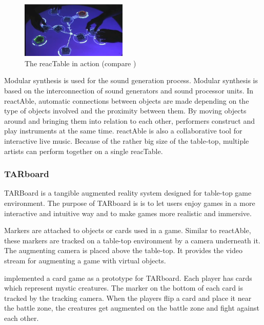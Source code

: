 \begin{figure}
\centering
\includegraphics[width=0.45\textwidth]{figures/reactable.pdf}
\caption{The reacTable in action (compare )}
\label{fig:reactable}
\end{figure}

Modular synthesis is used for the sound generation process. Modular synthesis is based on the interconnection of sound generators and sound processor units. In reactAble, automatic connections between objects are made depending on the type of objects involved and the proximity between them. By moving objects around and bringing them into relation to each other, performers construct and play instruments at the same time. reactAble is also a collaborative tool for interactive live music. Because of the rather big size of the table-top, multiple artists can perform together on a single reacTable. 

\subsubsection{TARboard}
TARBoard is a tangible augmented reality system designed for table-top game environment. The purpose of TARboard is is to let users enjoy games in a more interactive and intuitive way and to make games more realistic and immersive. 

Markers are attached to objects or cards used in a game. Similar to reactAble, these markers are tracked on a table-top environment by a camera underneath it. The augmenting camera is placed above the table-top. It provides the video stream for augmenting a game with virtual objects. 

\cite{lee05} implemented a card game as a prototype for TARboard. Each player has cards which represent mystic creatures. The marker on the bottom of each card is tracked by the tracking camera. When the players flip a card and place it near the battle zone, the creatures get augmented on the battle zone and fight against each other.

